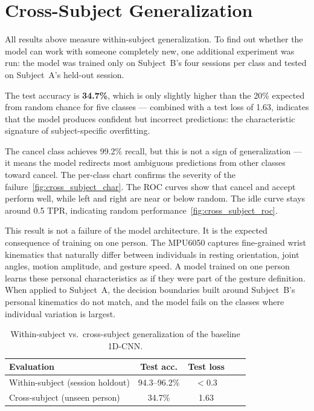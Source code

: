 \section{Cross-Subject Generalization}
\label{sec:cross_subject}
All results above measure within-subject generalization. To find out whether the model can work with someone completely new, one additional experiment was run: the model was trained only on Subject~B's four sessions per class and tested on Subject~A's held-out session. 

The test accuracy is \textbf{34.7\%}, which is only slightly higher than the 20\% expected from random chance for five classes — combined with a test loss of 1.63, indicates that the model produces confident but incorrect predictions: the characteristic signature of subject-specific overfitting. 

The cancel class achieves 99.2\% recall, but this is not a sign of generalization — it means the model redirects most ambiguous predictions from other classes toward cancel. The per-class chart confirms the severity of the failure~\ref{fig:cross_subject_char}. The ROC curves show that cancel and accept perform well, while left and right are near or below random. The idle curve stays around 0.5 TPR, indicating random performance~\ref{fig:cross_subject_roc}. 

This result is not a failure of the model architecture. It is the expected consequence of training on one person. The MPU6050 captures fine-grained wrist kinematics that naturally differ between individuals in resting orientation, joint angles, motion amplitude, and gesture speed. A model trained on one person learns these personal characteristics as if they were part of the gesture definition. When applied to Subject~A, the decision boundaries built around Subject~B's personal kinematics do not match, and the model fails on the classes where individual variation is largest.

\begin{table}[ht]
  \centering
  \caption{Within-subject vs.\ cross-subject generalization of the baseline 1D-CNN.}
  \label{tab:generalization}
  \begin{tabular}{lcccc}
    \toprule
    \textbf{Evaluation} & \textbf{Test acc.} & \textbf{Test loss} \\
    \midrule
    Within-subject (session holdout) & 94.3--96.2\% & $<0.3$ \\
    Cross-subject (unseen person)    & 34.7\%        & 1.63 \\
    \bottomrule
  \end{tabular}
\end{table}

